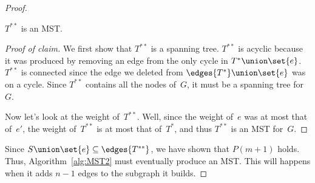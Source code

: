 \begin{proof}
\begin{claim}\label{claim:MST2}
$T^{**}$ is an MST.
\end{claim}

\begin{proof}[Proof of claim]
We first show that $T^{**}$ is a spanning tree.  $T^{**}$ is acyclic
because it was produced by removing an edge from the only cycle in
$T^{*} \union \set{e}$.  $T^{**}$ is connected since the edge we
deleted from $\edges{T^*} \union \set{e}$ was on a cycle.  Since
$T^{**}$ contains all the nodes of~$G$, it must be a spanning tree
for~$G$.

Now let's look at the weight of~$T^{**}$.  Well, since the weight
of~$e$ was at most that of~$e'$, the weight of~$T^{**}$ is at most
that of~$T^*$, and thus $T^{**}$ is an MST for~$G$.
\end{proof}

Since $S \union \set{e} \subseteq \edges{T^{**}}$, we have shown that
  $P(m + 1)$ holds.  Thus, Algorithm~\ref{alg:MST2} must eventually
  produce an MST\@.  This will happens when it adds $n - 1$ edges to
  the subgraph it builds.
\end{proof}
\fi

\begin{problems}
  \practiceproblems

  \examproblems

  \classproblems

  \homeworkproblems
\end{problems}

\endinput
